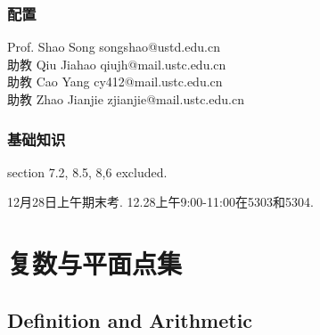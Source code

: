 \documentclass{ctexart}
\begin{document}
\subsubsection*{配置} %

\headerstamp

\noindent
Prof. Shao Song songshao@ustd.edu.cn \\
助教 Qiu Jiahao qiujh@mail.ustc.edu.cn\\
助教 Cao Yang cy412@mail.ustc.edu.cn\\
助教 Zhao Jianjie zjianjie@mail.ustc.edu.cn\\


\subsubsection*{基础知识} %
 
\centerline{
}
section 7.2, 8.5, 8,6 excluded.
\par
12月28日上午期末考. 12.28上午9:00-11:00在5303和5304.


\section{复数与平面点集} %
\label{sec:复数与平面点集}

\subsection{Definition and Arithmetic} %
\label{sub:definition_and_arithmetic}
\end{document}
